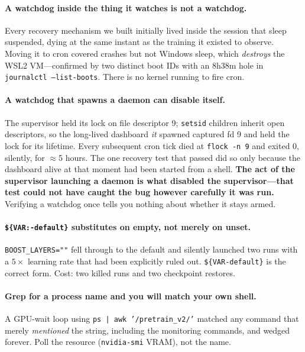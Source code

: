 \documentclass[11pt,a4paper]{article}
\begin{document}
\paragraph{A watchdog inside the thing it watches is not a watchdog.} Every recovery mechanism
we built initially lived inside the session that sleep suspended, dying at the same instant as
the training it existed to observe. Moving it to cron covered crashes but not Windows sleep,
which \emph{destroys} the WSL2 VM---confirmed by two distinct boot IDs with an 8h38m hole in
\texttt{journalctl --list-boots}. There is no kernel running to fire cron.

\paragraph{A watchdog that spawns a daemon can disable itself.} The supervisor held its lock on
file descriptor 9; \texttt{setsid} children inherit open descriptors, so the long-lived
dashboard \emph{it} spawned captured fd 9 and held the lock for its lifetime. Every subsequent
cron tick died at \texttt{flock -n 9} and exited 0, silently, for $\approx$5 hours. The one
recovery test that passed did so only because the dashboard alive at that moment had been
started from a shell. \textbf{The act of the supervisor launching a daemon is what disabled the
supervisor---that test could not have caught the bug however carefully it was run.} Verifying a
watchdog once tells you nothing about whether it stays armed.

\paragraph{\texttt{\$\{VAR:-default\}} substitutes on empty, not merely on unset.}
\texttt{BOOST\_LAYERS=""} fell through to the default and silently launched two runs with a
$5\times$ learning rate that had been explicitly ruled out. \texttt{\$\{VAR-default\}} is the
correct form. Cost: two killed runs and two checkpoint restores.

\paragraph{Grep for a process name and you will match your own shell.} A GPU-wait loop using
\texttt{ps | awk '/pretrain\_v2/'} matched any command that merely \emph{mentioned} the string,
including the monitoring commands, and wedged forever. Poll the resource
(\texttt{nvidia-smi} VRAM), not the name.
\end{document}
